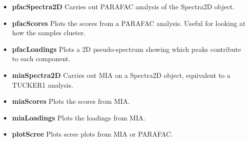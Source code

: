 \documentclass[letter,10pt,twocolumn,twoside,printwatermark=false]{pinp}
\providecommand{\tightlist}{%
  \setlength{\itemsep}{0pt}\setlength{\parskip}{0pt}}
\begin{document}
\begin{itemize}
  \begin{itemize}
  \tightlist
  \item
    \textbf{pfacSpectra2D} Carries out PARAFAC analysis of the Spectra2D
    object.
  \item
    \textbf{pfacScores} Plots the scores from a PARAFAC analysis. Useful
    for looking at how the samples cluster.
  \item
    \textbf{pfacLoadings} Plots a 2D pseudo-spectrum showing which peaks
    contribute to each component.
  \item
    \textbf{miaSpectra2D} Carries out MIA on a Spectra2D object,
    equivalent to a TUCKER1 analysis.
  \item
    \textbf{miaScores} Plots the scores from MIA.
  \item
    \textbf{miaLoadings} Plots the loadings from MIA.
  \item
    \textbf{plotScree} Plots scree plots from MIA or PARAFAC.
  \end{itemize}
\end{itemize}

\renewcommand{\pnasbreak}{\begin{strip}\vskip0pt\end{strip}}

\phantom{xxx}

\showacknow

\pnasbreak 



\end{document}
